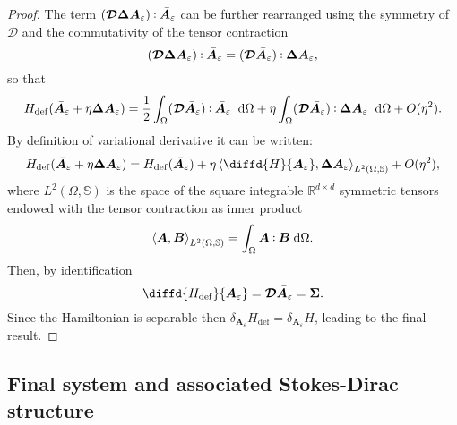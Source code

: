 \begin{proposition}
\begin{proof}
		The term $(\bm{\mathcal{D}} \bm{\Delta}\bm{A}_{\varepsilon}) \cddot \bar{\bm{A}}_{\varepsilon}$ can be further rearranged using the symmetry of $\bm{\mathcal{D}}$ and the commutativity of the tensor contraction
		\[ 
		(\bm{\mathcal{D}} \bm{\Delta}\bm{A}_{\varepsilon}) \cddot \bar{\bm{A}}_{\varepsilon} = (\bm{\mathcal{D}} \bar{\bm{A}}_{\varepsilon}) \cddot \bm{\Delta}\bm{A}_{\varepsilon},
		\]
		so that 
		\[H_{\mathrm{def}}(\bar{\bm{A}}_{\varepsilon} + \eta \bm{\Delta}\bm{A}_{\varepsilon}) = \frac{1}{2} \int_{\Omega} (\bm{\mathcal{D}} \bar{\bm{A}}_{\varepsilon}) \cddot \bar{\bm{A}}_{\varepsilon} \; \d\Omega + \eta \int_{\Omega} (\bm{\mathcal{D}} \bar{\bm{A}}_{\varepsilon}) \cddot \bm{\Delta}\bm{A}_{\varepsilon}\; \d\Omega  + O(\eta^2). \]
		By definition of  variational derivative it can be written:
		\[H_{\mathrm{def}}(\bar{\bm{A}}_{\varepsilon} + \eta \bm{\Delta}\bm{A}_{\varepsilon}) = H_{\mathrm{def}}(\bar{\bm{A}}_{\varepsilon}) + \eta \inner[L^2(\Omega, \mathbb{S})]{\diffd{H}{\bm{A}_{\varepsilon}}}{\bm{\Delta}\bm{A}_{\varepsilon}} + O(\eta^2), \]
		where $L^2(\Omega, \mathbb{S})$ is the space of the square integrable $\mathbb{R}^{d\times d}$ symmetric tensors endowed with the tensor contraction as inner product
		\begin{equation}\label{eq:normL2sym}
		\inner[L^2(\Omega, \mathbb{S})]{\bm{A}}{\bm{B}} = \int_{\Omega} \bm{A} \cddot \bm{B} \d\Omega. 
		\end{equation}
		Then, by identification 
		\[
		\diffd{H_{\mathrm{def}}}{\bm{A}_{\varepsilon}} = \bm{\mathcal{D}} \bar{\bm{A}}_{\varepsilon} = \bm{\Sigma}.
		\]
		Since the Hamiltonian is separable then $\delta_{\bm{A}_{\varepsilon}}{H_{\mathrm{def}}} =\delta_{\bm{A}_{\varepsilon}} H$, leading to the final result.
	\end{proof}
\end{proposition}

\subsection{Final system and associated Stokes-Dirac structure}

